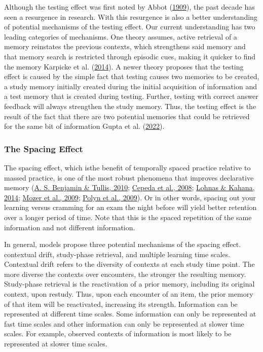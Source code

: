 \documentclass[
]{krantz}
\begin{document}
Although the testing effect was first noted by Abbot (\protect\hyperlink{ref-Abbot1909}{1909}), the past decade has seen a resurgence in research. With this resurgence is also a better understanding of potential mechanisms of the testing effect. Our current understanding has two leading categories of mechanisms. One theory assumes, active retrieval of a memory reinstates the previous contexts, which strengthens said memory and that memory search is restricted through episodic cues, making it quicker to find the memory Karpicke et al. (\protect\hyperlink{ref-Karpicke2014}{2014}). A newer theory proposes that the testing effect is caused by the simple fact that testing causes two memories to be created, a study memory initially created during the initial acquisition of information and a test memory that is created during testing. Further, testing with correct answer feedback will always strengthen the study memory. Thus, the testing effect is the result of the fact that there are two potential memories that could be retrieved for the same bit of information Gupta et al. (\protect\hyperlink{ref-Gupta2022}{2022}).

\hypertarget{the-spacing-effect}{%
\subsubsection*{The Spacing Effect}\label{the-spacing-effect}}


The spacing effect, which isthe benefit of temporally spaced practice relative to massed practice, is one of the most robust phenomena that improves declarative memory (\protect\hyperlink{ref-Benjamin2010}{A. S. Benjamin \& Tullis, 2010}; \protect\hyperlink{ref-Cepeda2008}{Cepeda et al., 2008}; \protect\hyperlink{ref-Lohnas2014}{Lohnas \& Kahana, 2014}; \protect\hyperlink{ref-Mozer2009}{Mozer et al., 2009}; \protect\hyperlink{ref-Polyn2009}{Polyn et al., 2009}). Or in other words, spacing out your learning versus cramming for an exam the night before will yield better retention over a longer period of time. Note that this is the spaced repetition of the same information and not different information.

In general, models propose three potential mechanisms of the spacing effect. contextual drift, study-phase retrieval, and multiple learning time scales. Contextual drift refers to the diversity of contexts at each study time point. The more diverse the contexts over encounters, the stronger the resulting memory. Study-phase retrieval is the reactivation of a prior memory, including its original context, upon restudy. Thus, upon each encounter of an item, the prior memory of that item will be reactivated, increasing its strength. Information can be represented at different time scales. Some information can only be represented at fast time scales and other information can only be represented at slower time scales. For example, observed contexts of information is most likely to be represented at slower time scales.
\end{document}
